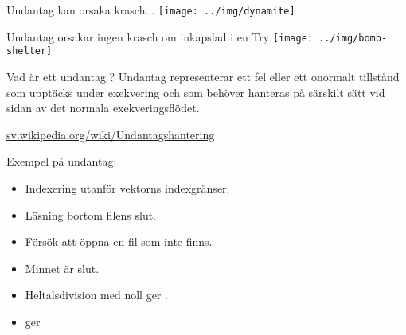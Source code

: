 




\ifkompendium\else
\begin{SlideExtra}{Undantag kan orsaka krasch...}
\texttt{[image: ../img/dynamite]}  
\end{SlideExtra}

\begin{SlideExtra}{Undantag orsakar ingen krasch om inkapslad i en Try}
\hspace{0.3\textwidth}\texttt{[image: ../img/bomb-shelter]}  
\end{SlideExtra}
\fi

\begin{Slide}{Vad är ett undantag ?}
Undantag representerar ett fel eller ett onormalt tillstånd som upptäcks under exekvering och som  behöver hanteras på särskilt sätt vid sidan av det normala exekveringsflödet.

\vspace{1em}\href{https://sv.wikipedia.org/wiki/Undantagshantering}{sv.wikipedia.org/wiki/Undantagshantering}


\vspace{1em} Exempel på undantag:

\pause

\begin{itemize} \SlideFontSmall
\item Indexering utanför vektorns indexgränser.

\item Läsning bortom filens slut.

\item Försök att öppna en fil som inte finns.

\item Minnet är slut.

\item Heltalsdivision med noll ger .

\item {} ger 

\end{itemize}

\end{Slide}



